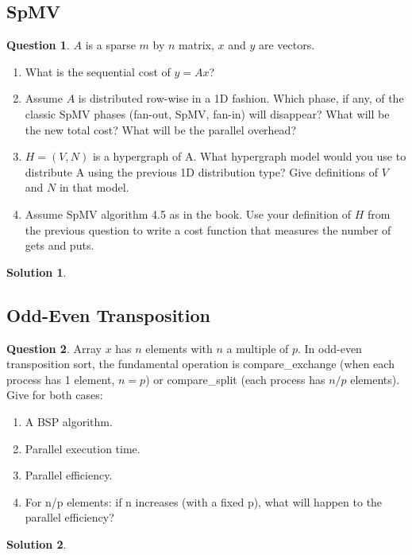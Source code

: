 \documentclass[a4paper, 10pt, oneside]{article}
\theoremstyle{definition}
\newtheorem*{question}{Question}
\newtheorem*{solution}{Solution}
\begin{document}
\subsection{SpMV}
\begin{question}
$A$ is a sparse $m$ by $n$ matrix, $x$ and $y$ are vectors.
\begin{enumerate}
	\item What is the sequential cost of $y=Ax$?
	\item Assume $A$ is distributed row-wise in a 1D fashion. Which phase, if any, of the classic SpMV phases (fan-out, SpMV, fan-in) will disappear? What will be the new total cost? What will be the parallel overhead?
	\item $H=(V,N)$ is a hypergraph of A. What hypergraph model would you use to distribute A using the previous 1D distribution type? Give definitions of $V$ and $N$ in that model.
	\item Assume SpMV algorithm 4.5 as in the book. Use your definition of $H$ from the previous question to write a cost function that measures the number of gets and puts.
\end{enumerate}
\end{question}
\begin{solution}
\end{solution}

\subsection{Odd-Even Transposition}
\begin{question}
Array $x$ has $n$ elements with $n$ a multiple of $p$. In odd-even transposition sort, the fundamental operation is compare_exchange (when each process has 1 element, $n=p$) or compare_split (each process has $n/p$ elements). Give for both cases:
\begin{enumerate}
	\item A BSP algorithm.
	\item Parallel execution time.
	\item Parallel efficiency.
	\item For n/p elements: if n increases (with a fixed p), what will happen to the parallel efficiency?
\end{enumerate}



\end{question}
\begin{solution}
\end{solution}
\end{document}
